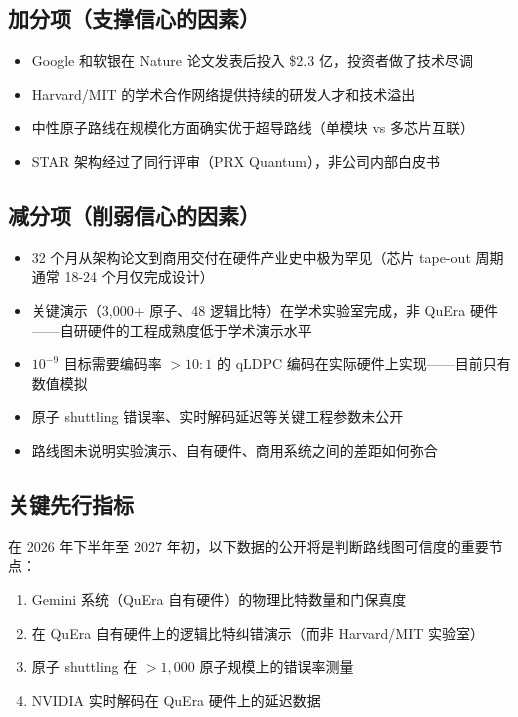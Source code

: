 \documentclass[11pt,a4paper]{ctexart}
\begin{document}
\subsection{加分项（支撑信心的因素）}

\begin{itemize}
\item Google 和软银在 Nature 论文发表后投入 \$2.3 亿，投资者做了技术尽调
\item Harvard/MIT 的学术合作网络提供持续的研发人才和技术溢出
\item 中性原子路线在规模化方面确实优于超导路线（单模块 vs 多芯片互联）
\item STAR 架构经过了同行评审（PRX Quantum），非公司内部白皮书
\end{itemize}

\subsection{减分项（削弱信心的因素）}

\begin{itemize}
\item 32 个月从架构论文到商用交付在硬件产业史中极为罕见（芯片 tape-out 周期通常 18-24 个月仅完成设计）
\item 关键演示（3,000+ 原子、48 逻辑比特）在学术实验室完成，非 QuEra 硬件——自研硬件的工程成熟度低于学术演示水平
\item $10^{-9}$ 目标需要编码率 $>10:1$ 的 qLDPC 编码在实际硬件上实现——目前只有数值模拟
\item 原子 shuttling 错误率、实时解码延迟等关键工程参数未公开
\item 路线图未说明实验演示、自有硬件、商用系统之间的差距如何弥合
\end{itemize}

\subsection{关键先行指标}

在 2026 年下半年至 2027 年初，以下数据的公开将是判断路线图可信度的重要节点：
\begin{enumerate}
\item Gemini 系统（QuEra 自有硬件）的物理比特数量和门保真度
\item 在 QuEra 自有硬件上的逻辑比特纠错演示（而非 Harvard/MIT 实验室）
\item 原子 shuttling 在 $>1,000$ 原子规模上的错误率测量
\item NVIDIA 实时解码在 QuEra 硬件上的延迟数据
\end{enumerate}
\end{document}
